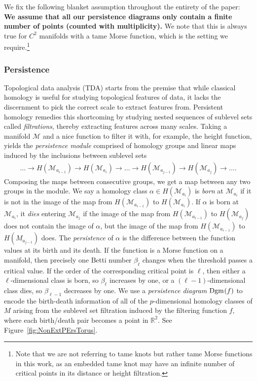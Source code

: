 \documentclass[twoside,leqno]{article}
\newcommand{\M}{\mathcal{M}}
\newcommand{\Dgm}[2]       {{\rm Dgm}_{#1}{({#2})}}
\begin{document}
We fix the following blanket assumption throughout the entirety of the paper:
\textbf{We assume that all our persistence diagrams only contain a finite number of points (counted with multiplicity).}  We note that this is always true for $C^2$ manifolds with a tame Morse function, which is the setting we require.\footnote{Note that we are not referring to tame knots but rather tame Morse functions in this work, as an embedded tame knot may have an infinite number of critical points in its distance or height filtration.}

%
%
%
%
%
%
%
%



\subsubsection{Persistence}

Topological data analysis (TDA) starts from the premise that while classical homology is useful for studying topological features of data, it lacks the discernment to pick the correct scale to extract features from. Persistent homology remedies this shortcoming by studying nested sequences of sublevel sets called \emph{filtrations}, thereby extracting features across many scales. 
Taking a manifold $\M$ and a nice function to filter it with, for example, the height function, yields the \emph{persistence module} comprised of homology groups and linear maps induced by the inclusions between sublevel sets
\begin{align}
  \ldots \to H(\M_{a_{i-1}}) \to H(\M_{a_{i}}) \to \ldots \to H(\M_{a_{j-1}}) \to H(\M_{a_j}) \to \ldots .
\end{align}
Composing the maps between consecutive groups, we get a map between any two groups in the module.
We say a homology class $\alpha \in H(\M_{a_i})$ is \emph{born} at $\M_{a_i}$ if it is not in the image of the map from $H(\M_{a_{i-1}})$ to $H(\M_{a_i})$.
If $\alpha$ is born at $\M_{a_i}$, it \emph{dies} entering $\M_{a_j}$ if the image of the map from $H(\M_{a_{i-1}})$ to $H(\M_{a_{j}})$ does not contain the image of $\alpha$, but the image of the map from $H(\M_{a_{i-1}})$ to $H(M_{a_{j-1}})$ does. 
The \emph{persistence} of $\alpha$ is the difference between the function values at its birth and its death.
If the function is a Morse function on a manifold, then precisely one Betti number $\beta_{{\tilde{\ell}}}$ changes when the threshold passes a critical value.
If the order of the corresponding critical point is ${\ell}$, then either a ${\ell}$-dimensional class is born, so $\beta_{\ell}$ increases by one, or a $({\ell}-1)$-dimensional class dies, so $\beta_{{\ell}-1}$ decreases by one.
We use a \emph{persistence diagram} $\Dgm{}{f}$ to encode the  birth-death information of all of the $p$-dimensional homology classes of $M$ arising from the sublevel set filtration induced by the filtering function $f$, where each birth/death pair becomes a point in $\mathbb{R}^2$.  See Figure~\ref{fig:NonExtPErsTorus}.
\end{document}
